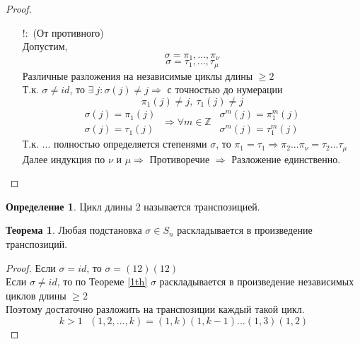 \documentclass[a4paper, 12pt]{article}
\newcommand{\Z}{\mathbb Z}
\theoremstyle{definition}
\newtheorem*{definition}{Определение}
\newtheorem*{theorem}{Теорема}
\newtheorem*{properties}{Свойства}
\begin{document}
\begin{proof}
\begin{itemize}
\begin{properties}
\begin{enumerate}
\begin{proof}
        \end{proof} 
      \end{enumerate}
    \end{properties}
    $\{1,...,n\} = \underset{k_1}{Orb(i_1)} \sqcup ... \sqcup \underset{k_t}{Orb(i_t)}\sqcup \underset{k_{t+1}}{Orb(i_{t+1})} \sqcup ... \sqcup \underset{k_s}{Orb(i_s)}$ \\ $\\$ 
    Если $\sigma \neq id$, то $k_1>1,...,k_t>1,k_{t+1}=1,...,k_s=1 \Longrightarrow \\
    \sigma = (i_1 \ \sigma(i_1) \ ... \ \sigma^{k_1-1}(i_1)) \ ... \ (i_t \ \sigma(i_t) \ ... \ \sigma^{k_t-1}(i_t))$. $\exists$ \ доказано.   
    \item[ $!:$ ](От противного)\\
    Допустим, $$\sigma = \pi_1,...,\pi_{\nu}$$ $$\sigma = \tau_1,...,\tau_{\mu}$$  Различные разложения на независимые циклы длины $\geq 2$ \\
    Т.к. $\sigma \neq id$, то $\exists \ j: \sigma(j) \neq j \Longrightarrow $ с точностью до нумерации $$\pi_1(j) \neq j, \ \tau_1(j) \neq j$$  
    $$\begin{matrix}
      \sigma(j) = \pi_1(j) \\
      \sigma(j) = \tau_1(j)
    \end{matrix} \ \Longrightarrow \forall m \in \Z  \ \ \begin{matrix}
      \sigma^m(j) = \pi_1^m(j) \\
      \sigma^m(j) = \tau_1^m(j)
    \end{matrix}$$ 
    Т.к. ... полностью определяется степенями $\sigma$, то $\pi_1 = \tau_1 \Longrightarrow \pi_2 ... \pi_{\nu} = \tau_2 ... \tau_{\mu}$ Далее индукция по $\nu$ и $\mu \Longrightarrow $ Противоречие $\Longrightarrow $ Разложение единственно.   
    \end{itemize}
  \end{proof} 
  \begin{definition}
    Цикл длины 2 называется транспозицией. 
  \end{definition}
  \begin{theorem}
    Любая подстановка $\sigma \in S_n$ раскладывается в произведение транспозиций. 
  \end{theorem} 
  \begin{proof}
    Если $\sigma = id$, то $\sigma = (12)(12)$ \\
    Если $\sigma \neq id$, то по Теореме \eqref{1th} $\sigma$ раскладывается в произведение независимых циклов длины $\geq 2$ \\
    Поэтому достаточно разложить на транспозиции каждый такой цикл.
    $$k>1 \ \ \ (1,2,...,k) = (1,k)(1,k-1)...(1,3)(1,2)$$     
  \end{proof} 
\end{document}
